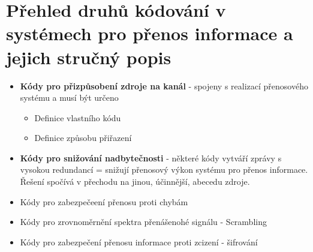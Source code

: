 \section{Přehled druhů kódování v systémech pro přenos informace a jejich stručný popis}
\begin{itemize}
    \item  \textbf{Kódy pro přizpůsobení zdroje na kanál} - spojeny s realizací přenosového systému a musí být určeno
\begin{itemize}
    \item Definice vlastního kódu
    \item Definice způsobu přiřazení
\end{itemize}
\item \textbf{Kódy pro snižování nadbytečnosti} - některé kódy vytváří zprávy s vysokou redundancí = snižují přenosový výkon systému pro přenos informace. Řešení spočívá v přechodu na jinou, účinnější, abecedu zdroje.
\item Kódy pro zabezpečeení přenosu proti chybám
\item Kódy pro zrovnoměrnění spektra přenášenohé signálu - Scrambling
\item Kódy pro zabezpečení přenosu informace proti zcizení - šifrování
\end{itemize}